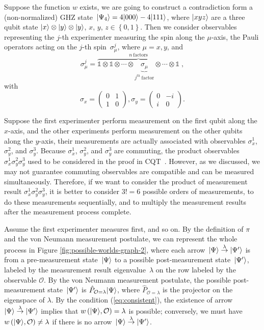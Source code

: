 \documentclass[english,12pt]{iopart}
\makeatletter
\theoremstyle{plain}
\newenvironment{proof}[1][\protect\proofname]{\par
\normalfont\topsep6\p@\@plus6\p@\relax
\trivlist
\itemindent\parindent
\item[\hskip\labelsep\scshape #1]\ignorespaces
}{%
\endtrivlist\@endpefalse
}
\providecommand{\proofname}{Proof}
\theoremstyle{definition}
\newcommand{\dpr}{{\pi}}
\makeatother
\begin{document}
\begin{proof}Suppose the function $w$ exists, we are going to construct
a contradiction form a (non-normalized) GHZ state~${\left\vert{\Psi_{4}}\right\rangle}=4{\left\vert{000}\right\rangle}-4{\left\vert{111}\right\rangle}$,
where ${\left\vert{xyz}\right\rangle}$ are a three qubit state ${\left\vert{x}\right\rangle}\otimes{\left\vert{y}\right\rangle}\otimes{\left\vert{y}\right\rangle}$,
$x$, $y$, $z\in\left\{ 0,1\right\} $. Then we consider observables
representing the $j$-th experimenter measuring the spin along the
$\mu$-axis, the Pauli operators acting on the $j$-th spin~$\sigma_{\mu}^{j}$,
where $\mu=x,y$, and 
\begin{equation}
\sigma_{\mu}^{j}=\overbrace{\mathds{1}\otimes\mathds{1}\otimes\cdots\otimes\underbrace{\sigma_{\mu}}_{j^{th}\ \mbox{factor}}\otimes\cdots\otimes\mathds{1}}^{n\ \mbox{factors}}\;,\label{pauli3}
\end{equation}
with 
\[
\sigma_{x}=\left(\begin{array}{cc}
0 & 1\\
1 & 0
\end{array}\right),\sigma_{y}=\left(\begin{array}{cc}
0 & -i\\
i & 0
\end{array}\right).
\]

Suppose the first experimenter perform measurement on the first qubit
along the $x$-axis, and the other experiments perform measurement on
the other qubits along the $y$-axis, their measurements are actually
associated with observables $\sigma_{x}^{1}$, $\sigma_{y}^{2}$, and
$\sigma_{y}^{3}$. Because $\sigma_{x}^{1}$, $\sigma_{y}^{2}$, and
$\sigma_{y}^{3}$ are commuting, the product
observables~$\sigma_{x}^{1}\sigma_{y}^{2}\sigma_{y}^{3}$ used to be
considered in the proof in CQT~\cite{MerminPRL1990,peres1995quantum}.
However, as we discussed, we may not guarantee commuting observables
are compatible and can be measured simultaneously. Therefore, if we
want to consider the product of measurement result
$\sigma_{x}^{1}\sigma_{y}^{2}\sigma_{y}^{3}$, it is better to consider
$3!=6$ possible orders of measurements, to do these measurements
sequentially, and to multiply the measurement results after the
measurement process complete.

Assume the first experimenter measures first, and so on. By the
definition of $\dpr $ and the von Neumann measurement postulate, we
can represent the whole process in Figure
\ref{fig:possible-worlds-graph-2}, where each
arrow~$\ket{\Psi}\overset{\lambda}{\rightarrow}\ket{\Psi'}$ is from a
pre-measurement state~${\left\vert{\Psi}\right\rangle}$ to a possible post-measurement
state~${\left\vert{\Psi'}\right\rangle}$, labeled by the measurement result
eigenvalue~$\lambda$ on the row labeled by the observable
$\mathcal{O}$. By the von Neumann measurement postulate, the possible
post-measurement state~${\left\vert{\Psi'}\right\rangle}$ is
$\hat{P}_{\mathcal{O}=\lambda}{\left\vert{\Psi}\right\rangle}$, where
$\hat{P}_{\mathcal{O}=\lambda}$ is the projector on the eigenspace of
$\lambda$. By the condition (\ref{eq:consistent}), the existence of
arrow~$\ket{\Psi}\overset{\lambda}{\rightarrow}\ket{\Psi'}$ implies
that $w\left({\left\vert{\Psi}\right\rangle},\mathcal{O}\right)=\lambda$ is possible;
conversely, we must have
$w\left({\left\vert{\Psi}\right\rangle},\mathcal{O}\right)\ne\lambda$ if there is no
arrow~$\ket{\Psi}\overset{\lambda}{\rightarrow}\ket{\Psi'}$.


\end{proof}
\end{document}
